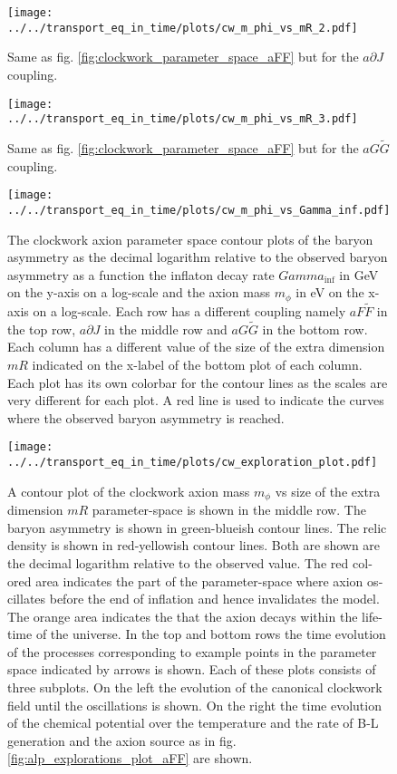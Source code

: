 \documentclass[master,       %
               twoside,        %
               BCOR10mm,       %
               english,ngerman, %
               ]{GAUBM}
\begin{document}
\begin{otherlanguage}{english}
\begin{figure}[h]
    \texttt{[image: ../../transport\_eq\_in\_time/plots/cw\_m\_phi\_vs\_mR\_2.pdf]}
    \caption{Same as fig. \ref{fig:clockwork_parameter_space_aFF} but for the $a \partial J$ coupling.}
\end{figure}

\begin{figure}[h]
    \texttt{[image: ../../transport\_eq\_in\_time/plots/cw\_m\_phi\_vs\_mR\_3.pdf]}
    \caption{Same as fig. \ref{fig:clockwork_parameter_space_aFF} but for the $a G \tilde{G}$ coupling.}
\end{figure}

\begin{figure}[h]
    \texttt{[image: ../../transport\_eq\_in\_time/plots/cw\_m\_phi\_vs\_Gamma\_inf.pdf]}
    \caption{The clockwork axion parameter space contour plots of the baryon asymmetry as the decimal logarithm relative to the observed baryon asymmetry as a function the inflaton decay rate $Gamma_\mathrm{inf}$ in GeV on the y-axis on a log-scale and the axion mass $m_\phi$ in eV on the x-axis on a log-scale.
    Each row has a different coupling namely $a F \tilde{F}$ in the top row, $a \partial J$ in the middle row and $a G \tilde{G}$ in the bottom row. Each column has a different value of the size of the extra dimension $mR$ indicated on the x-label of the bottom plot of each column. Each plot has its own colorbar for the contour lines as the scales are very different for each plot. A red line is used to indicate the curves where the observed baryon asymmetry is reached.}
\end{figure}

\begin{figure}[h]
	\texttt{[image: ../../transport\_eq\_in\_time/plots/cw\_exploration\_plot.pdf]}
	\caption{A contour plot of the clockwork axion mass $m_\phi$ vs size of the extra dimension $mR$ parameter-space is shown in the middle row. The baryon asymmetry is shown in green-blueish contour lines. The relic density is shown in red-yellowish contour lines. Both are shown are the decimal logarithm relative to the observed value. The red colored area indicates the part of the parameter-space where axion oscillates before the end of inflation and hence invalidates the model. The orange area indicates the that the axion decays within the life-time of the universe. In the top and bottom rows the time evolution of the processes corresponding to example points in the parameter space indicated by arrows is shown. Each of these plots consists of three subplots. On the left the evolution of the canonical clockwork field until the oscillations is shown. On the right the time evolution of the chemical potential over the temperature and the rate of B-L generation and the axion source as in fig. \ref{fig:alp_explorations_plot_aFF} are shown.}
\end{figure}


\end{otherlanguage}
\end{document}
